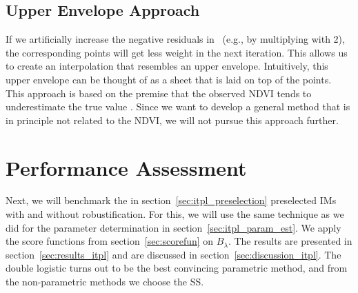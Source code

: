 {	\subsection{Upper Envelope Approach}
		If we artificially increase the negative residuals in~ (e.g.,  by multiplying with 2), the corresponding points will get less weight in the next iteration. This allows us to create an interpolation that resembles an upper envelope. Intuitively, this upper envelope can be thought of as a sheet that is laid on top of the points.
		This approach is based on the premise that the observed NDVI tends to underestimate the true value \citep{caoSimpleMethodImprove2018b}. Since we want to develop a general method that is in principle not related to the NDVI, we will not pursue this approach further.	
}
\section{Performance Assessment}{\label{sec:itpl_perfomance_assessment}
	Next, we will benchmark the in section~\ref{sec:itpl_preselection} preselected {{IM}}s with and without robustification. For this, we will use the same technique as we did for the parameter determination in section~\ref{sec:itpl_param_est}. We apply the score functions from section~\ref{sec:scorefun} on $B_\lambda$.  
	The results are presented in section~\ref{sec:results_itpl} and are discussed in section~\ref{sec:discussion_itpl}. The double logistic turns out to be the best convincing parametric method, and from the non-parametric methods we choose the SS.
}


